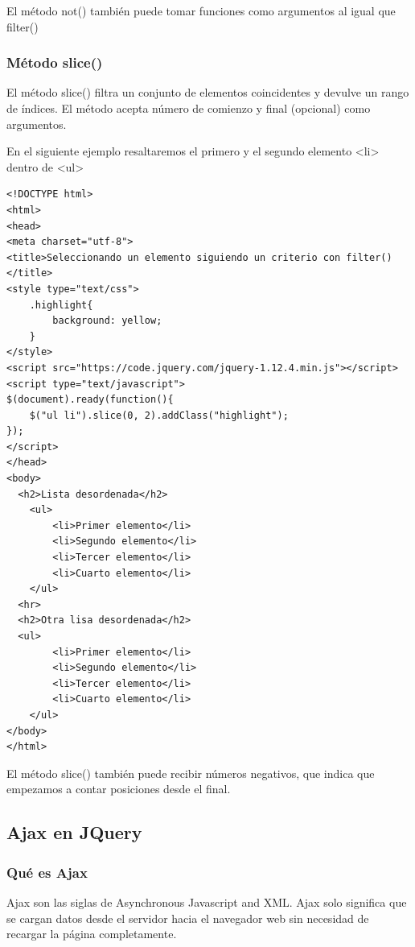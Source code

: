 \documentclass[11pt]{article}
\begin{document}
El método not() también puede tomar funciones como argumentos al igual que filter()

\subsubsection*{Método slice()}
\label{sec:org9331592}

El método slice() filtra un conjunto de elementos coincidentes y devulve un rango de índices. El método acepta número de comienzo y final (opcional) como argumentos. 

En el siguiente ejemplo resaltaremos el primero y el segundo elemento <li> dentro de <ul>


\begin{verbatim}
<!DOCTYPE html>
<html>
<head>
<meta charset="utf-8">
<title>Seleccionando un elemento siguiendo un criterio con filter()</title>
<style type="text/css">
    .highlight{
        background: yellow;
    }        
</style>
<script src="https://code.jquery.com/jquery-1.12.4.min.js"></script>
<script type="text/javascript">
$(document).ready(function(){
    $("ul li").slice(0, 2).addClass("highlight");
});
</script>
</head>
<body>
  <h2>Lista desordenada</h2>
    <ul>
        <li>Primer elemento</li>
        <li>Segundo elemento</li>
        <li>Tercer elemento</li>
        <li>Cuarto elemento</li>
    </ul>
  <hr>
  <h2>Otra lisa desordenada</h2>
  <ul>
        <li>Primer elemento</li>
        <li>Segundo elemento</li>
        <li>Tercer elemento</li>
        <li>Cuarto elemento</li>
    </ul>
</body>
</html>                                		
\end{verbatim}


El método slice() también puede recibir números negativos, que indica que empezamos a contar posiciones desde el final.

\subsection*{Ajax en JQuery}
\label{sec:orgeb19afb}

\subsubsection*{Qué es Ajax}
\label{sec:orgfb6becc}

Ajax son las siglas de Asynchronous Javascript and XML. Ajax solo significa que se cargan datos desde el servidor hacia el navegador web sin necesidad de recargar la página completamente.
\end{document}
